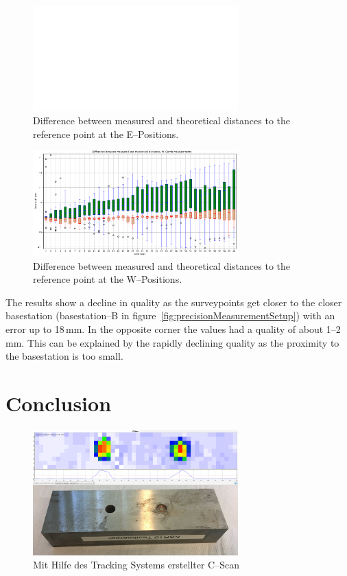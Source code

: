 \documentclass{VRARWorkshop}
\begin{document}
\begin{figure}[h!]
    \begin{center}
        \includegraphics[width=79mm]{images/distancesBoxplot-E.pdf}
        \caption{\label{fig:boxplotE} Difference between measured and theoretical distances to the reference point at the E--Positions.}
    \end{center}
\end{figure}

\begin{figure}[h!]
    \begin{center}
        \includegraphics[width=79mm]{images/distancesBoxplot-W.pdf}
        \caption{\label{fig:boxplotW} Difference between measured and theoretical distances to the reference point at the W--Positions.}
    \end{center}
\end{figure}

The results show a decline in quality as the surveypoints get closer to the closer basestation (basestation--B in figure~\ref{fig:precisionMeasurementSetup}) with an error up to 18\,mm.
In the opposite corner the values had a quality of about 1--2\,mm.
This can be explained by the rapidly declining quality as the proximity to the basestation is too small.

\section{Conclusion}

\begin{figure}[h!]
    \begin{center}
        \includegraphics[width=79mm]{images/CScanARUS.jpg}
        \caption{\label{fig:resultCScan} Mit Hilfe des Tracking Systems erstellter C--Scan}
    \end{center}
\end{figure}

\VRARsetbibstyle

\end{document}
